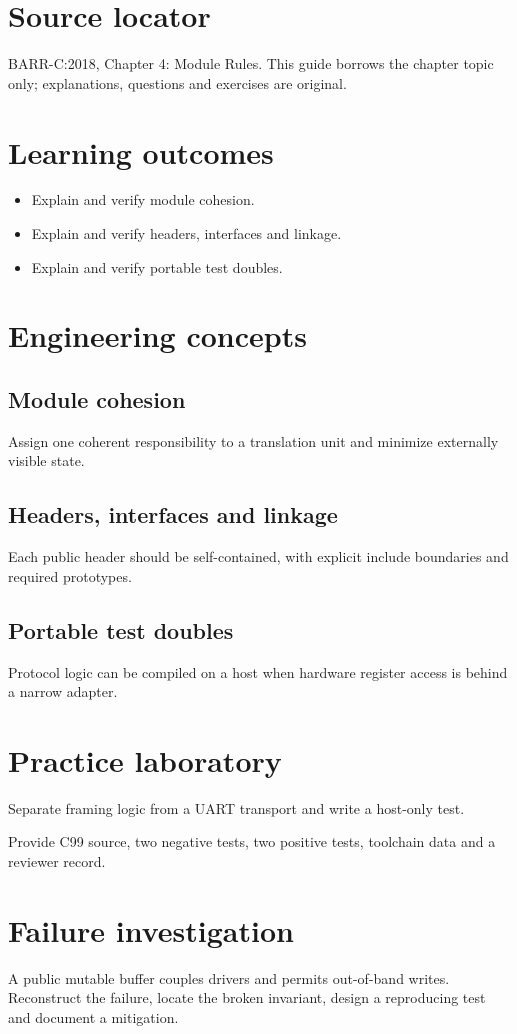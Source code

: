 \documentclass[10pt,letterpaper]{article}
\begin{document}
\makedoctitle
\makedocsummary
\section{Source locator}
BARR-C:2018, Chapter 4: Module Rules. This guide borrows the chapter topic only; explanations, questions and exercises are original.
\section{Learning outcomes}
\begin{itemize}
\item Explain and verify module cohesion.
\item Explain and verify headers, interfaces and linkage.
\item Explain and verify portable test doubles.
\end{itemize}

\section{Engineering concepts}
\subsection{Module cohesion}
Assign one coherent responsibility to a translation unit and minimize externally visible state.

\subsection{Headers, interfaces and linkage}
Each public header should be self-contained, with explicit include boundaries and required prototypes.

\subsection{Portable test doubles}
Protocol logic can be compiled on a host when hardware register access is behind a narrow adapter.

\section{Practice laboratory}
Separate framing logic from a UART transport and write a host-only test.

Provide C99 source, two negative tests, two positive tests, toolchain data and a reviewer record.
\section{Failure investigation}
A public mutable buffer couples drivers and permits out-of-band writes. Reconstruct the failure, locate the broken invariant, design a reproducing test and document a mitigation.
\end{document}
